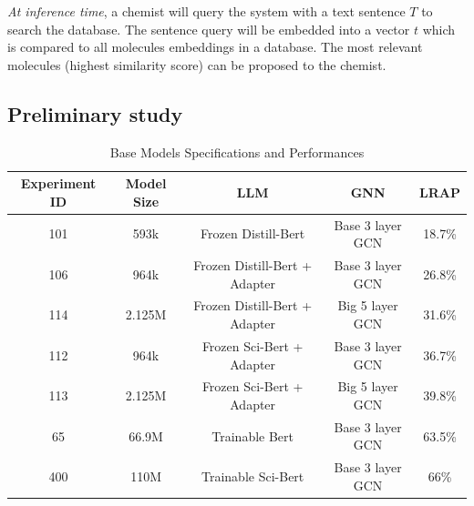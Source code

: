 \textit{At inference time}, a chemist will query the system with a text sentence $T$ to search the database. The sentence query will be embedded into a vector $t$ which is compared to all molecules embeddings in a database. The most relevant molecules (highest similarity score) can be proposed to the chemist.

\subsection*{Preliminary study}
\label{sec:preliminary study}

\begin{table}[ht]
    \centering
    \begin{tabular}{|c|c|c|c|c|}
    \hline
    \textbf{Experiment ID} & \textbf{Model Size} & \textbf{LLM} & \textbf{GNN} & \textbf{LRAP} \\ \hline
    101         & 593k                & Frozen Distill-Bert           & Base 3 layer GCN       & 18.7\%      \\ \hline
    106         & 964k                & Frozen Distill-Bert + Adapter & Base 3 layer GCN       & 26.8\%      \\ \hline
    114         & 2.125M              & Frozen Distill-Bert + Adapter & Big 5 layer GCN        & 31.6\%      \\ \hline
    112         & 964k                & Frozen Sci-Bert + Adapter     & Base 3 layer GCN       & 36.7\%      \\ \hline
    113         & 2.125M              & Frozen Sci-Bert + Adapter     & Big 5 layer GCN        & 39.8\%      \\ \hline
    65          & 66.9M               & Trainable Bert                & Base 3 layer GCN       & 63.5\%      \\ \hline
    400         & 110M                & Trainable Sci-Bert            & Base 3 layer GCN       & 66\%        \\ \hline
    \end{tabular}
    \caption{Base Models Specifications and Performances}
    \label{tab:preliminary_study_metrics}
\end{table}



